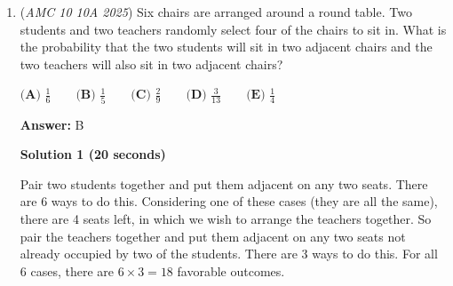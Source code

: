 \begin{enumerate}
 



\textbf{Solution 12 (Quadratics)}

We assign variable $n$ as $\frac{1}{k}.$ For the sake of simplicity, we can assume that the outermost square has a side lenght of $n^2$. Thus, the next two inner side lenghts are $n$ and $1.$  Next, we realize that the square with side lenght $1$ is "similar" to the larger square. Because of this, we know that $64\%$ of it, or $.64$ units squared, is shaded. This means that the shaded area of the larger square is $.64$ units squared combined with the outer shaded ring. Thus:

 
 \[n^4 - n^2 + .64 = .64n^4\]

 To not deal with quartics, we assign $a$ to $n^2.$ Next, we simplify:

 
 \[a^2 - a + .64 = .64a^2\]

 \[100a^2 - 100a + 64 = 64a^2\]

 \[36a^2 - 100a + 64 = 0\]

 \[9a^2 - 25a + 16 = 0\]

 Using the quadratic equation, we obtain values  $\frac{16}{9}$ and $1$. We disregard $1$ because it would cause every square to have the same side lenght. Square rooting $\frac{16}{9}$ yields $\frac{4}{3}$ for $n$ and thus $\frac{3}{4}$ for $k.$



	\item (\textit{AMC 10 10A 2025}) Six chairs are arranged around a round table. Two students and two teachers randomly select four of the chairs to sit in. What is the probability that the two students will sit in two adjacent chairs and the two teachers will also sit in two adjacent chairs?


 $\textbf{(A) } \frac{1}{6} \qquad\textbf{(B) } \frac{1}{5} \qquad\textbf{(C) } \frac{2}{9} \qquad\textbf{(D) } \frac{3}{13} \qquad\textbf{(E) } \frac{1}{4}$

 \textbf{Answer: }B



\textbf{Solution 1 (20 seconds)}

Pair two students together and put them adjacent on any two seats. There are 6 ways to do this. Considering one of these cases (they are all the same), there are 4 seats left, in which we wish to arrange the teachers together. So pair the teachers together and put them adjacent on any two seats not already occupied by two of the students. There are 3 ways to do this. For all 6 cases, there are \( 6 \times 3 = 18 \) favorable outcomes.


\end{enumerate}

